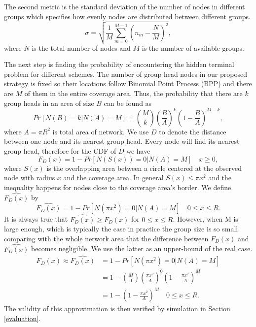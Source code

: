 The second metric is the standard deviation of the number of nodes in different groups which specifies how evenly nodes are distributed between different groups.
\begin{equation}
\sigma=\sqrt{\frac{1}{M}\sum_{m=0}^{M-1}\left( n_m - \frac{N}{M} \right)^2},
\end{equation}
where $N$ is the total number of nodes and $M$ is the number of available groups.

The next step is finding the probability of encountering the hidden terminal problem for different schemes. The number of group head nodes in our proposed strategy is fixed so their locations follow Binomial Point Process (BPP) and there are $M$ of them in the entire coverage area. Thus, the probability that there are $k$ group heads in an area of size $B$ can be found as
\begin{equation}
Pr[ N(B)=k | N(A)=M]={M \choose k} \left( \frac{B}{A} \right)^k \left( 1- \frac{B}{A} \right)^{M-k},
\end{equation}
where $A=\pi R^2$ is total area of network. We use $D$ to denote the distance between one node and its nearest group head. Every node will find its nearest group head, therefore for the CDF of $D$ we have
\begin{equation}
F_D(x)=1-Pr[N(S(x))=0 | N(A)=M] \quad x \geq 0,
\end{equation}
where $S(x)$ is the overlapping area between a circle centered at the observed node with radius $x$ and the coverage area. In general $S(x) \leq \pi x^2$ and the inequality happens for nodes close to the coverage area's border. We define $\hat{F_D(x)}$ by
\begin{equation}
\hat{F_D(x)}=1-Pr[N(\pi x^2)=0 | N(A)=M] \quad 0 \leq x \leq R.
\end{equation}
It is always true that $\hat{F_D(x)} \geq F_D(x)$ for $0 \leq x \leq R$. However, when M is large enough, which is typically the case in practice \cite{zheng2014performance} the group size is so small comparing with the whole network area that the difference between $F_D(x)$ and $\hat{F_D(x)}$ becomes negligible. We use the latter as an upper-bound of the real case.
\begin{equation} \label{eq:cdf}
\begin{split}
F_D(x) \approx \hat{F_D(x)} &=1-Pr[N(\pi x^2)=0 | N(A)=M] \\
&=1- {M \choose 0} \left( \frac{\pi x^2}{A} \right)^0 \left( 1- \frac{\pi x^2}{A} \right)^{M} \\
&=1- \left( 1- \frac{\pi x^2}{A} \right)^{M} \quad 0 \leq x \leq R.
\end{split}
\end{equation}
The validity of this approximation is then verified by simulation in Section \ref{evaluation}.

